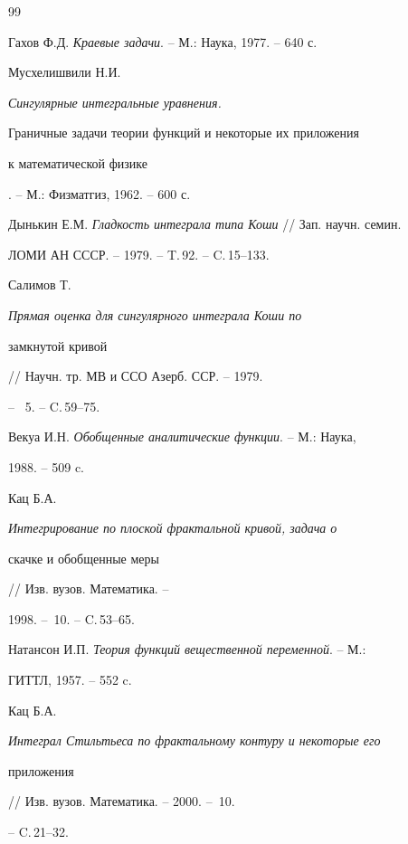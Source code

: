 \begin{thebibliography}{99}







Гахов Ф.Д. {\em Краевые задачи}. -- М.: Наука, 1977. -- 640 с.




Мусхелишвили Н.И. {\it Сингулярные интегральные уравнения.


Граничные задачи теории функций и некоторые их приложения


к математической физике}. -- М.: Физматгиз, 1962. -- 600 с.




Дынькин Е.М. {\em Гладкость интеграла типа Коши} // Зап. научн. семин.


ЛОМИ АН СССР. -- 1979. -- T.\,92. -- C.\,15--133.




Салимов Т. {\em Прямая оценка для сингулярного интеграла Коши по


замкнутой кривой} // Научн. тр. МВ и ССО Азерб. ССР. -- 1979.


-- \No\, 5. -- C.\,59--75.




Векуа И.Н. {\em Обобщенные аналитические функции}. -- М.: Наука,


1988. -- 509 c.




Кац Б.А. {\em Интегрирование по плоской фрактальной кривой, задача о


скачке и обобщенные меры} // Изв. вузов. Математика. --


1998. -- \No\,10. -- C.\,53--65.




Натансон И.П. {\em Теория функций вещественной переменной}. -- М.:


ГИТТЛ, 1957. -- 552 c.




Кац Б.А. {\em Интеграл Стильтьеса по фрактальному контуру и некоторые его


приложения} // Изв. вузов. Математика. -- 2000. -- \No\,10.


-- C.\,21--32.





\end{thebibliography}





\vskip 2cm












\label{end}





